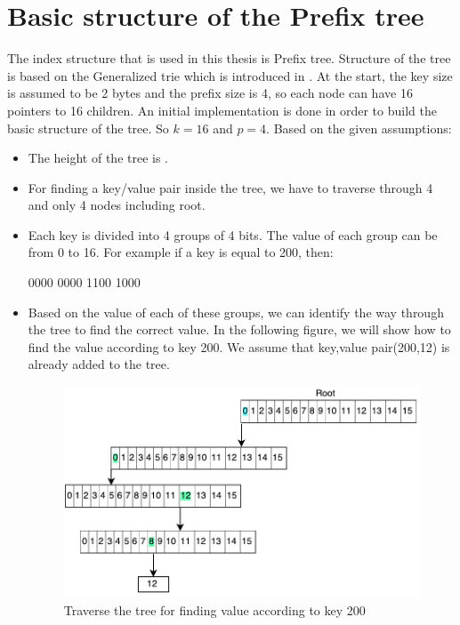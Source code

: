\documentclass[12pt]{report}
\begin{document}
\section{Basic structure of the Prefix tree}
 
 The index structure that is used in this thesis is Prefix tree. Structure of the tree is based on the Generalized trie which is introduced in \cite{Boehm}.  At the start, the key size is assumed to be 2 bytes and the prefix size is 4, so each node can have 16 pointers to 16 children. An initial implementation is done in order to build the basic structure of the tree. So $k=16$ and $p=4$. Based on the given assumptions:  

\begin{itemize}
  \item The height of the tree is .
  \item For finding a key/value pair inside the tree, we have to traverse through 4 and only 4 nodes including root.
  \item Each key is divided into 4 groups of 4 bits. The value of each group can be from 0 to 16. For example if a key is equal to 200, then:
  
  0000 0000 1100 1000 \\ 
  \item Based on the value of each of these groups, we can identify the way through the tree to find the correct value. In the following figure, we will show how to find the value according to key 200. We assume that key,value pair(200,12) is already added to the tree.
  
\begin{figure}[h]
\includegraphics[scale=0.6]{tree}
\caption{ Traverse the tree for finding value according to key 200}
\centering

\end{figure}
\end{itemize}
\end{document}
